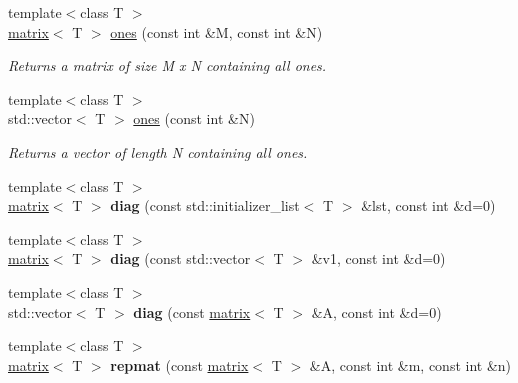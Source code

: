 \begin{DoxyCompactItemize}
{\footnotesize template$<$class T $>$ }\\\hyperlink{classkeycpp_1_1matrix}{matrix}$<$ T $>$ \hyperlink{namespacekeycpp_a388f91a0ccf34978ef9403ccd0c680bf}{ones} (const int \&M, const int \&N)
\begin{DoxyCompactList}\small\item\em Returns a matrix of size M x N containing all ones. \end{DoxyCompactList}\item 
{\footnotesize template$<$class T $>$ }\\std\-::vector$<$ T $>$ \hyperlink{namespacekeycpp_a831e69a9395f6dfe9e02af46e8b4273b}{ones} (const int \&N)
\begin{DoxyCompactList}\small\item\em Returns a vector of length N containing all ones. \end{DoxyCompactList}\item 
\hypertarget{namespacekeycpp_a4bb3ea9a842383b82c889179f25be9ec}{{\footnotesize template$<$class T $>$ }\\\hyperlink{classkeycpp_1_1matrix}{matrix}$<$ T $>$ {\bfseries diag} (const std\-::initializer\-\_\-list$<$ T $>$ \&lst, const int \&d=0)}\label{namespacekeycpp_a4bb3ea9a842383b82c889179f25be9ec}

\item 
\hypertarget{namespacekeycpp_a400213b20d0dc5e0b31b1bf49f191f11}{{\footnotesize template$<$class T $>$ }\\\hyperlink{classkeycpp_1_1matrix}{matrix}$<$ T $>$ {\bfseries diag} (const std\-::vector$<$ T $>$ \&v1, const int \&d=0)}\label{namespacekeycpp_a400213b20d0dc5e0b31b1bf49f191f11}

\item 
\hypertarget{namespacekeycpp_ac8468ea36d1466ddeda8c64b9f46f8dd}{{\footnotesize template$<$class T $>$ }\\std\-::vector$<$ T $>$ {\bfseries diag} (const \hyperlink{classkeycpp_1_1matrix}{matrix}$<$ T $>$ \&A, const int \&d=0)}\label{namespacekeycpp_ac8468ea36d1466ddeda8c64b9f46f8dd}

\item 
\hypertarget{namespacekeycpp_ab56165975dd12a86b498134da71bde29}{{\footnotesize template$<$class T $>$ }\\\hyperlink{classkeycpp_1_1matrix}{matrix}$<$ T $>$ {\bfseries repmat} (const \hyperlink{classkeycpp_1_1matrix}{matrix}$<$ T $>$ \&A, const int \&m, const int \&n)}\label{namespacekeycpp_ab56165975dd12a86b498134da71bde29}


\end{DoxyCompactItemize}
